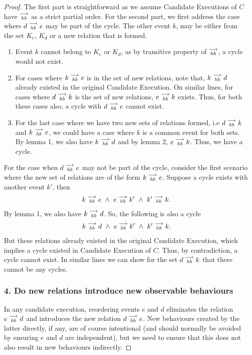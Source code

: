 \begin{proof}
        The first part is straightforward as we assume Candidate Executions of $C$ have $\stackrel{\longrightarrow}{_\textit{hb}}$ as a strict partial order. For the second part, we first address the case where $d\stackrel{\longrightarrow}{_{\textit{hb}}}e$ may be part of the cycle. The other event $k$, may be either from the set $K_e$, $K_d$ or a new relation that is formed.
        
        \begin{enumerate}
            \item Event $k$ cannot belong to $K_e$ or $K_d$, as by transitive property of $\stackrel{\longrightarrow}{_{hb}}$, a cycle would not exist. 
            \item For cases where $k\stackrel{\longrightarrow}{_{\textit{hb}}}e$ is in the set of new relations, note that, $k\stackrel{\longrightarrow}{_{\textit{hb}}}d$ already existed in the original Candidate Execution. On similar lines, for cases where $d\stackrel{\longrightarrow}{_{\textit{hb}}}k$ is the set of new relations, $e\stackrel{\longrightarrow}{_{\textit{hb}}}k$ exists. Thus, for both these cases also, a cycle with $d\stackrel{\longrightarrow}{_{\textit{hb}}}e$  cannot exist. 
            \item For the last case where we have two new sets of relations formed, i.e $d\stackrel{\longrightarrow}{_{\textit{hb}}}k$ and $k\stackrel{\longrightarrow}{_{\textit{hb}}}e$, we could have a case where $k$ is a common event for both sets. By lemma 1, we also have $k\stackrel{\longrightarrow}{_{\textit{hb}}}d$ and by lemma 2, $e\stackrel{\longrightarrow}{_{\textit{hb}}}k$. Thus, we have a cycle. 
        \end{enumerate}
        
        For the case when $d\stackrel{\longrightarrow}{_{\textit{hb}}}e$ may not be part of the cycle, consider the first scenario where the new set of relations are of the form $k\stackrel{\longrightarrow}{_{\textit{hb}}}e$. Suppose a cycle exists with another event $k'$, then
        \begin{align*}
            \reln{k}{hb}{e} \ \wedge \ \reln{e}{hb}{k'} \ \wedge \ \reln{k'}{hb}{k}.
        \end{align*}
        By lemma 1, we also have $k\stackrel{\longrightarrow}{_{\textit{hb}}}d$. So, the following is also a cycle
        \begin{align*}
            \reln{k}{hb}{d} \ \wedge \ \reln{e}{hb}{k'} \ \wedge \ \reln{k'}{hb}{k}.
        \end{align*}
        But these relations already existed in the original Candidate Execution, which implies a cycle existed in Candidate Execution of $C$. Thus, by contradiction, a cycle cannot exist. In similar lines we can show for the set $d\stackrel{\longrightarrow}{_{\textit{hb}}}k$ that there cannot be any cycles. 
        
        \subsubsection{4. Do new relations introduce new observable behaviours}
        In any candidate execution, reordering events $e$ and $d$ eliminates the relation $e\stackrel{\longrightarrow}{_{\textit{hb}}}d$ and introduces the new relation $d\stackrel{\longrightarrow}{_{\textit{hb}}}e$.  New behaviours created by the latter directly, if any, are 
        of course intentional (and should normally be avoided by ensuring $e$ and $d$ are independent), but we need to ensure that this does not also result in new behaviours indirectly.


\end{proof}
